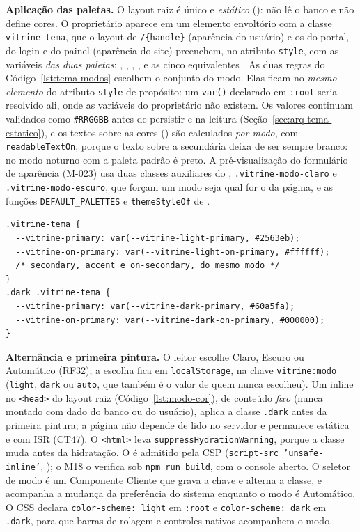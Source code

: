 \textbf{Aplicação das paletas.} O layout raiz é único e \emph{estático} (): não lê o banco e não define cores. O proprietário aparece em um elemento envoltório com a classe \texttt{vitrine-tema}, que o layout de \texttt{/\{handle\}} (aparência do usuário) e os do portal, do login e do painel (aparência do site) preenchem, no atributo \texttt{style}, com as variáveis \emph{das duas paletas}: , , , ,  e as cinco equivalentes . As duas regras do Código~\ref{lst:tema-modos} escolhem o conjunto do modo. Elas ficam no \emph{mesmo elemento} do atributo \texttt{style} de propósito: um \texttt{var()} declarado em \texttt{:root} seria resolvido ali, onde as variáveis do proprietário não existem. Os valores continuam validados como \texttt{\#RRGGBB} antes de persistir e na leitura (Seção~\ref{sec:arq-tema-estatico}), e os textos sobre as cores () são calculados \emph{por modo}, com \texttt{readableTextOn}, porque o texto sobre a secundária deixa de ser sempre branco: no modo noturno com a paleta padrão é preto. A pré-visualização do formulário de aparência (M-023) usa duas classes auxiliares do , \texttt{.vitrine-modo-claro} e \texttt{.vitrine-modo-escuro}, que forçam um modo seja qual for o da página, e as funções \texttt{DEFAULT\_PALETTES} e \texttt{themeStyleOf} de .

\begin{lstlisting}[language=VCSS, caption={Escolha do conjunto de cores pelo modo (esboço normativo; vale também para as demais cores)}, label={lst:tema-modos}]
.vitrine-tema {
  --vitrine-primary: var(--vitrine-light-primary, #2563eb);
  --vitrine-on-primary: var(--vitrine-light-on-primary, #ffffff);
  /* secondary, accent e on-secondary, do mesmo modo */
}
.dark .vitrine-tema {
  --vitrine-primary: var(--vitrine-dark-primary, #60a5fa);
  --vitrine-on-primary: var(--vitrine-dark-on-primary, #000000);
}
\end{lstlisting}

\textbf{Alternância e primeira pintura.} O leitor escolhe Claro, Escuro ou Automático (RF32); a escolha fica em \texttt{localStorage}, na chave \texttt{vitrine:modo} (\texttt{light}, \texttt{dark} ou \texttt{auto}, que também é o valor de quem nunca escolheu). Um  inline no \texttt{<head>} do layout raiz (Código~\ref{lst:modo-cor}), de conteúdo \emph{fixo} (nunca montado com dado do banco ou do usuário), aplica a classe \texttt{.dark} antes da primeira pintura; a página não depende de  lido no servidor e permanece estática e com ISR (CT47). O \texttt{<html>} leva \texttt{suppressHydrationWarning}, porque a classe muda antes da hidratação. O  é admitido pela CSP (\texttt{script-src 'unsafe-inline'}, ); o M18 o verifica sob \texttt{npm run build}, com o console aberto. O seletor de modo é um Componente Cliente que grava a chave e alterna a classe, e acompanha a mudança da preferência do sistema enquanto o modo é Automático. O CSS declara \texttt{color-scheme: light} em \texttt{:root} e \texttt{color-scheme: dark} em \texttt{.dark}, para que barras de rolagem e controles nativos acompanhem o modo.

